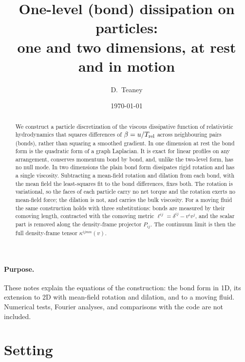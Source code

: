 \documentclass[11pt,aps,preprint,nofootinbib,superscriptaddress,tightenlines]{revtex4-2}
\let\oldparagraph\paragraph
\renewcommand{\paragraph}{\par\bigskip\oldparagraph}
\begin{document}
\title{One-level (bond) dissipation on particles:\\ one and two dimensions, at rest and in motion}
\author{D.~Teaney}
\date{\today}

\begin{abstract}
We construct a particle discretization of the viscous dissipative function of
relativistic hydrodynamics that squares differences of $\beta=u/T_{\rm rel}$ across
neighbouring pairs (bonds), rather than squaring a smoothed gradient.  In one
dimension at rest the bond form is the quadratic form of a graph Laplacian.  It
is exact for linear profiles on any arrangement, conserves momentum bond by
bond, and, unlike the two-level form, has no null mode.  In two dimensions
the plain bond form dissipates rigid rotation and has a single viscosity.
Subtracting a mean-field rotation and dilation from each bond, with the mean
field the least-squares fit to the bond differences, fixes both.  The rotation
is variational, so the faces of each particle carry no net torque and the
rotation exerts no mean-field force; the dilation is not, and carries the bulk
viscosity.  For a moving fluid the same construction holds with three
substitutions: bonds are measured by their comoving length, contracted with the
comoving metric $\ell^{ij}=\delta^{ij}-v^iv^j$, and the scalar part is removed
along the density-frame projector $P_{ij}$.  The continuum limit is then the
full density-frame tensor $\kappa^{ijmn}(v)$.
\end{abstract}

\maketitle

\paragraph{Purpose.}  These notes explain the equations of the construction:
the bond form in 1D, its extension to 2D with mean-field rotation and
dilation, and to a moving fluid.  Numerical tests, Fourier analyses, and
comparisons with the code are not included.

\section{Setting}
\label{sec:setting}
\end{document}
